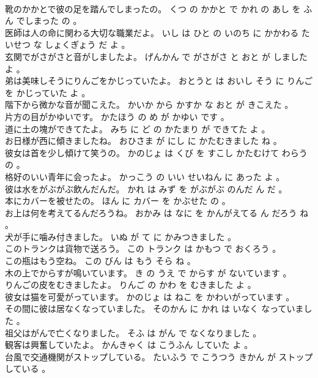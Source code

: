 \documentclass[8pt]{extreport}
\begin{document}
\begin{CJK}{UTF8}{min}
\\	靴のかかとで彼の足を踏んでしまったの。	くつ の かかと で かれ の あし を ふん でしまった の 。 
\\	医師は人の命に関わる大切な職業だよ。	いし は ひと の いのち に かかわる たいせつ な しょくぎょう だ よ 。 
\\	玄関でがさがさと音がしましたよ。	げんかん で がさがさ と おと が しました よ 。 
\\	弟は美味しそうにりんごをかじっていたよ。	おとうと は おいし そう に りんご を かじっていた よ 。 
\\	階下から微かな音が聞こえた。	かいか から かすか な おと が きこえた 。 
\\	片方の目がかゆいです。	かたほう の め が かゆい です 。 
\\	道に土の塊ができてたよ。	みち に ど の かたまり が できてた よ 。 
\\	お日様が西に傾きましたね。	おひさま が にし に かたむきました ね 。 
\\	彼女は首を少し傾けて笑うの。	かのじょ は くび を すこし かたむけて わらう の 。 
\\	格好のいい青年に会ったよ。	かっこう の いい せいねん に あった よ 。 
\\	彼は水をがぶがぶ飲んだんだ。	かれ は みず を がぶがぶ のんだ ん だ 。 
\\	本にカバーを被せたの。	ほん に カバー を かぶせた の 。 
\\	お上は何を考えてるんだろうね。	おかみ は なに を かんがえてる ん だろう ね 。 
\\	犬が手に噛み付きました。	いぬ が て に かみつきました 。 
\\	このトランクは貨物で送ろう。	この トランク は かもつ で おくろう 。 
\\	この瓶はもう空ね。	この びん は もう そら ね 。 
\\	木の上でからすが鳴いています。	き の うえ で からす が ないています 。 
\\	りんごの皮をむきましたよ。	りんご の かわ を むきました よ 。 
\\	彼女は猫を可愛がっています。	かのじょ は ねこ を かわいがっています 。 
\\	その間に彼は居なくなっていました。	そのかん に かれ は いなく なっていました 。 
\\	祖父はがんで亡くなりました。	そふ は がん で なくなりました 。 
\\	観客は興奮していたよ。	かんきゃく は こうふん していた よ 。 
\\	台風で交通機関がストップしている。	たいふう で こうつう きかん が ストップ している 。 

\end{CJK}
\end{document}
